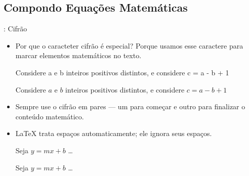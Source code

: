 \documentclass{beamer}
\begin{document}
\subsection{Compondo Equaç\~oes Matem\'aticas}
\begin{frame}[fragile]{\insertsubsection{}: Cifr\~ao}
	\begin{itemize}
		\item Por que o caracteter cifr\~ao \keystrokebftt{\$} \'e especial? Porque usamos esse caractere para marcar elementos matem\'aticos no texto.\\[1ex]
	\begin{exampletwouptiny}
		Considere a e b inteiros positivos
		distintos, e considere c = a - b + 1
		
		Considere $a$ e $b$ inteiros positivos
		distintos, e considere $c = a - b + 1$
	\end{exampletwouptiny}
	\item Sempre use o cifr\~ao em pares --- um para começar e outro para finalizar o conte\'udo matem\'atico.
	
	\item \LaTeX{} trata espaços automaticamente; ele ignora seus espaços.

	\begin{exampletwouptiny}
		Seja $y=mx+b$ \ldots
		
		Seja $y = m x + b$ \ldots
	\end{exampletwouptiny}
	\end{itemize}
\end{frame}
\end{document}
